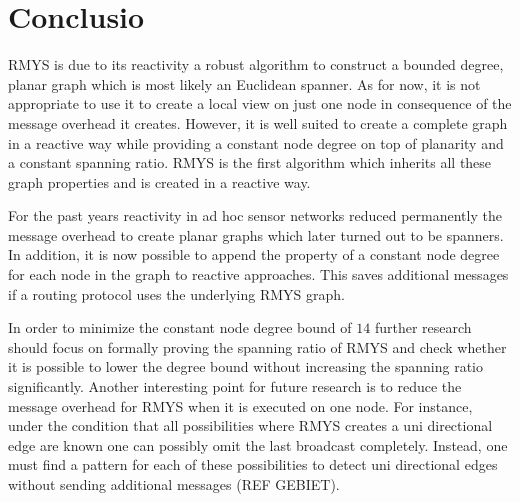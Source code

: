 \section{Conclusio}
RMYS is due to its reactivity a robust algorithm to construct a bounded degree, planar graph which is most likely an Euclidean spanner.
As for now, it is not appropriate to use it to create a local view on just one node in consequence of the message overhead it creates.
However, it is well suited to create a complete graph in a reactive way while providing a constant node degree on top of planarity and a constant spanning ratio.
RMYS is the first algorithm which inherits all these graph properties and is created in a reactive way.

For the past years reactivity in ad hoc sensor networks reduced permanently the message overhead to create planar graphs which later turned out to be spanners.
In addition, it is now possible to append the property of a constant node degree for each node in the graph to reactive approaches.
This saves additional messages if a routing protocol uses the underlying RMYS graph.

In order to minimize the constant node degree bound of $14 $ further research should focus on formally proving the spanning ratio of RMYS and check whether it is possible to lower the degree bound without increasing the spanning ratio significantly.
Another interesting point for future research is to reduce the message overhead for RMYS when it is executed on one node.
For instance, under the condition that all possibilities where RMYS creates a uni directional edge are known one can possibly omit the last broadcast completely.
Instead, one must find a pattern for each of these possibilities to detect uni directional edges without sending additional messages (REF GEBIET).